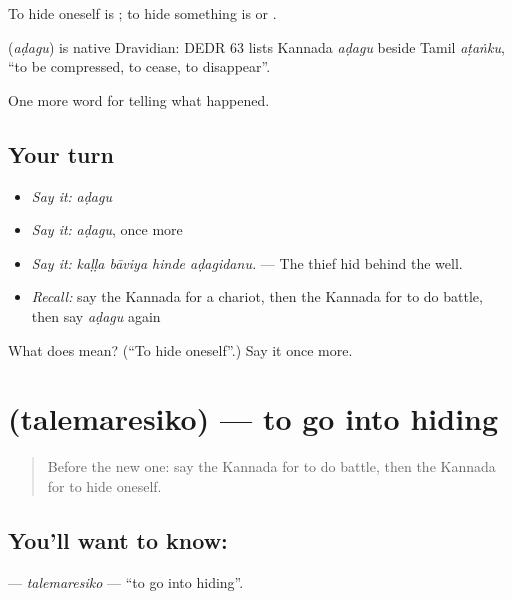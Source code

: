 To hide oneself is ; to hide something is  or .

\begin{cousinweb}
\textbf{} (\emph{aḍagu}) is native Dravidian: DEDR 63 lists Kannada \emph{aḍagu} beside Tamil \emph{aṭaṅku}, \textquotedblleft{}to be compressed, to cease, to disappear\textquotedblright{}.
\end{cousinweb}

\begin{grammarlens}[title={What you've built}]
One more word for telling what happened.
\end{grammarlens}

\subsection*{Your turn}
\begin{itemize}
\raggedright
  \item \emph{Say it:} \emph{aḍagu}
  \item \emph{Say it:} \emph{aḍagu}, once more
  \item \emph{Say it:} \emph{kaḷḷa bāviya hinde aḍagidanu.} — The thief hid behind the well.
  \item \emph{Recall:} say the Kannada for a chariot, then the Kannada for to do battle, then say \emph{aḍagu} again
\end{itemize}

\begin{tcolorbox}[breakable,colback=teal!4,colframe=teal!35!black,title={Before you move on}]
What does  mean? (\textquotedblleft{}To hide oneself\textquotedblright{}.) Say it once more.
\end{tcolorbox}
\section[\texorpdfstring{\kn{ತಲೆಮರೆಸಿಕೊ} (talemaresiko)}{ತಲೆಮರೆಸಿಕೊ (talemaresiko)}]{ (talemaresiko) — to go into hiding}

\label{lesson:KA-C345-talemaresiko}



\begin{quote}
Before the new one: say the Kannada for to do battle, then the Kannada for to hide oneself.
\end{quote}

\subsection*{You'll want to know: }
\textbf{} — \emph{talemaresiko} — \textquotedblleft{}to go into hiding\textquotedblright{}.

